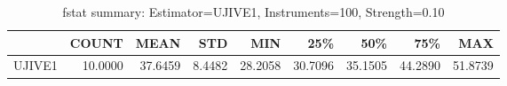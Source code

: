 \begin{table}[ht]
\centering
\caption{fstat summary: Estimator=UJIVE1, Instruments=100, Strength=0.10}
\begin{tabular}{lrrrrrrrr}
\toprule
 & COUNT & MEAN & STD & MIN & 25\% & 50\% & 75\% & MAX \\
\midrule
UJIVE1 & 10.0000 & 37.6459 & 8.4482 & 28.2058 & 30.7096 & 35.1505 & 44.2890 & 51.8739 \\
\bottomrule
\end{tabular}
\end{table}
